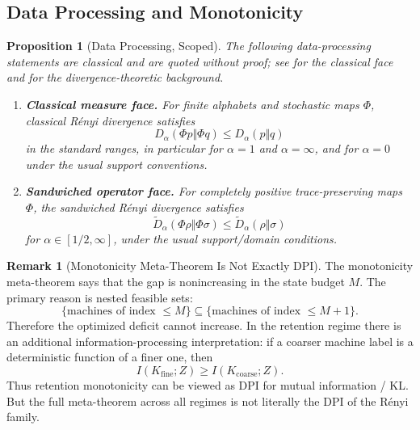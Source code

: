 \documentclass[12pt]{article}
\newtheorem{proposition}[theorem]{Proposition}
\theoremstyle{definition}
\newtheorem{remark}[theorem]{Remark}
\newcommand{\Ren}[1]{D_{#1}}
\newcommand{\sRen}[1]{\widetilde D_{#1}}
\begin{document}
\subsection{Data Processing and Monotonicity}
\label{subsec:exponent-dpi}

\begin{proposition}[Data Processing, Scoped]
\label{prop:DPI-scoped}
The following data-processing statements are classical and are quoted without
proof; see \cite{cover} for the classical face and \cite{tsybakov2009} for the
divergence-theoretic background.
\begin{enumerate}[label=(\alph*)]
\item \textbf{Classical measure face.}
For finite alphabets and stochastic maps $\Phi$, classical R\'enyi divergence
satisfies
\[
\Ren{\alpha}(\Phi p\Vert \Phi q)
\le
\Ren{\alpha}(p\Vert q)
\]
in the standard ranges, in particular for $\alpha=1$ and $\alpha=\infty$, and
for $\alpha=0$ under the usual support conventions.

\item \textbf{Sandwiched operator face.}
For completely positive trace-preserving maps $\Phi$, the sandwiched R\'enyi
divergence satisfies
\[
\sRen{\alpha}(\Phi\rho\Vert\Phi\sigma)
\le
\sRen{\alpha}(\rho\Vert\sigma)
\]
for $\alpha\in[1/2,\infty]$, under the usual support/domain conditions.
\end{enumerate}
\end{proposition}

\begin{remark}[Monotonicity Meta-Theorem Is Not Exactly DPI]
\label{rem:monotonicity-not-dpi}
The monotonicity meta-theorem says that the gap is nonincreasing in the state
budget $M$.  The primary reason is nested feasible sets:
\[
\{\text{machines of index }\le M\}
\subseteq
\{\text{machines of index }\le M+1\}.
\]
Therefore the optimized deficit cannot increase.  In the retention regime there
is an additional information-processing interpretation: if a coarser machine
label is a deterministic function of a finer one, then
\[
I(K_{\mathrm{fine}};Z)
\ge
I(K_{\mathrm{coarse}};Z).
\]
Thus retention monotonicity can be viewed as DPI for mutual information / KL.
But the full meta-theorem across all regimes is not literally the DPI of the
R\'enyi family.
\end{remark}

\end{document}
